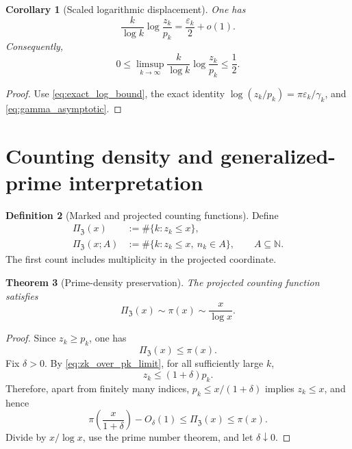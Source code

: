 \documentclass[11pt]{amsart}
\numberwithin{equation}{section}
\theoremstyle{plain}
\newtheorem{theorem}{Theorem}[section]
\newtheorem{corollary}[theorem]{Corollary}
\theoremstyle{definition}
\newtheorem{definition}[theorem]{Definition}
\theoremstyle{remark}
\newcommand{\ZP}{\mathfrak Z}
\newcommand{\N}{\mathbb N}
\begin{document}
\begin{corollary}[Scaled logarithmic displacement]
\label{cor:scaled_log_displacement}
One has
\begin{equation}
 \frac{k}{\log k}\log\frac{z_k}{p_k}
 =\frac{\varepsilon_k}{2}+o(1).
 \label{eq:scaled_log_displacement_limit}
\end{equation}
Consequently,
\begin{equation}
 0\leq\limsup_{k\to\infty}
 \frac{k}{\log k}\log\frac{z_k}{p_k}
 \leq\frac12.
 \label{eq:scaled_log_limsup}
\end{equation}
\end{corollary}

\begin{proof}
Use \eqref{eq:exact_log_bound}, the exact identity
$\log(z_k/p_k)=\pi\varepsilon_k/\gamma_k$, and
\eqref{eq:gamma_asymptotic}.
\end{proof}

\section{Counting density and generalized-prime interpretation}
\label{sec:counting_density}

\begin{definition}[Marked and projected counting functions]
\label{def:counting_functions}
Define
\begin{align}
 \Pi_{\ZP}(x)
 &:=\#\{k:z_k\leq x\},
 \label{eq:projected_counting_function}
 \\
 \Pi_{\ZP}(x;A)
 &:=\#\{k:z_k\leq x,\ n_k\in A\},
 \qquad A\subseteq\N.
 \label{eq:marked_counting_function}
\end{align}
The first count includes multiplicity in the projected coordinate.
\end{definition}

\begin{theorem}[Prime-density preservation]
\label{thm:prime_density_preservation}
The projected counting function satisfies
\begin{equation}
 \Pi_{\ZP}(x)\sim\pi(x)\sim\frac{x}{\log x}.
 \label{eq:zprime_counting_asymptotic}
\end{equation}
\end{theorem}

\begin{proof}
Since $z_k\geq p_k$, one has
\begin{equation}
 \Pi_{\ZP}(x)\leq\pi(x).
 \label{eq:counting_upper}
\end{equation}
Fix $\delta>0$.  By \eqref{eq:zk_over_pk_limit}, for all sufficiently
large $k$,
\begin{equation}
 z_k\leq(1+\delta)p_k.
 \label{eq:eventual_multiplicative_delta}
\end{equation}
Therefore, apart from finitely many indices,
$p_k\leq x/(1+\delta)$ implies $z_k\leq x$, and hence
\begin{equation}
 \pi\left(\frac{x}{1+\delta}\right)-O_\delta(1)
 \leq\Pi_{\ZP}(x)
 \leq\pi(x).
 \label{eq:counting_squeeze}
\end{equation}
Divide by $x/\log x$, use the prime number theorem, and let
$\delta\downarrow0$.
\end{proof}
\end{document}
